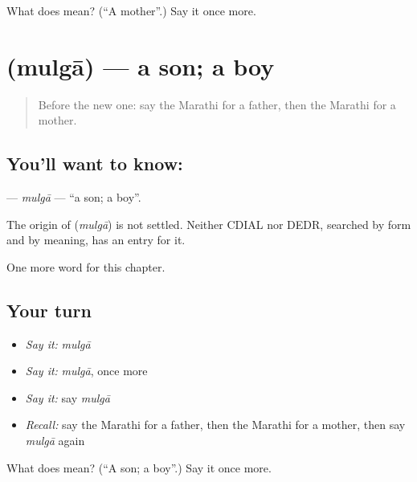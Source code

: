 \begin{tcolorbox}[breakable,colback=teal!4,colframe=teal!35!black,title={Before you move on}]
What does  mean? (\textquotedblleft{}A mother\textquotedblright{}.) Say it once more.
\end{tcolorbox}
\section[\texorpdfstring{\mr{मुलगा} (mulgā)}{मुलगा (mulgā)}]{ (mulgā) — a son; a boy}

\label{lesson:MR-C74-mulga}



\begin{quote}
Before the new one: say the Marathi for a father, then the Marathi for a mother.
\end{quote}

\subsection*{You'll want to know: }
\textbf{} — \emph{mulgā} — \textquotedblleft{}a son; a boy\textquotedblright{}.

\begin{cousinweb}
The origin of \textbf{} (\emph{mulgā}) is not settled. Neither CDIAL nor DEDR, searched by form and by meaning, has an entry for it.
\end{cousinweb}

\begin{grammarlens}[title={What you've built}]
One more word for this chapter.
\end{grammarlens}

\subsection*{Your turn}
\begin{itemize}
\raggedright
  \item \emph{Say it:} \emph{mulgā}
  \item \emph{Say it:} \emph{mulgā}, once more
  \item \emph{Say it:} say \emph{mulgā}
  \item \emph{Recall:} say the Marathi for a father, then the Marathi for a mother, then say \emph{mulgā} again
\end{itemize}

\begin{tcolorbox}[breakable,colback=teal!4,colframe=teal!35!black,title={Before you move on}]
What does  mean? (\textquotedblleft{}A son; a boy\textquotedblright{}.) Say it once more.
\end{tcolorbox}
